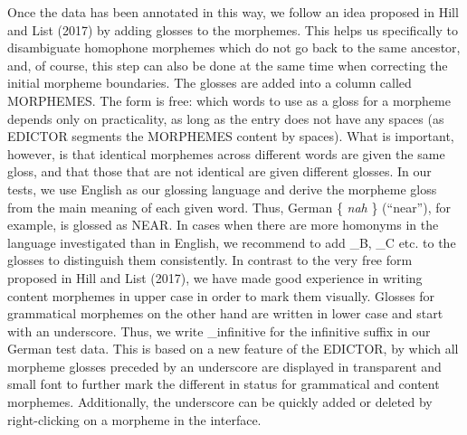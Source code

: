 \documentclass[
  a4paper,
  14pt,
  oneside,
  tablecaptionabove
]{scrbook}
\begin{document}
\begin{table}
\captionsetup{justification=centering}
\caption*{\small \textbf{Table 2:} Entries from the German wordlist of the
Intercontinental Dictionary Series (Key and Comrie 2015), in IPA with
morpheme borders.}
\end{table}

Once the data has been annotated in this way, we follow an idea proposed
in Hill and List (2017) by adding glosses to the morphemes. This helps
us specifically to disambiguate homophone morphemes which do not go back
to the same ancestor, and, of course, this step can also be done at the
same time when correcting the initial morpheme boundaries. The glosses
are added into a column called MORPHEMES. The form is free: which words
to use as a gloss for a morpheme depends only on practicality, as long
as the entry does not have any spaces (as EDICTOR segments the MORPHEMES
content by spaces). What is important, however, is that identical
morphemes across different words are given the same gloss, and that
those that are not identical are given different glosses. In our tests,
we use English as our glossing language and derive the morpheme gloss
from the main meaning of each given word. Thus, German \{ \emph{nah} \}
(\enquote{near}), for example, is glossed as NEAR. In cases when there
are more homonyms in the language investigated than in English, we
recommend to add \_B, \_C etc. to the glosses to distinguish them
consistently. In contrast to the very free form proposed in Hill and
List (2017), we have made good experience in writing content morphemes
in upper case in order to mark them visually. Glosses for grammatical
morphemes on the other hand are written in lower case and start with an
underscore. Thus, we write { \_infinitive } for the infinitive suffix in
our German test data. This is based on a new feature of the EDICTOR, by
which all morpheme glosses preceded by an underscore are displayed in
transparent and small font to further mark the different in status for
grammatical and content morphemes. Additionally, the underscore can be
quickly added or deleted by right-clicking on a morpheme in the
interface.
\end{document}
